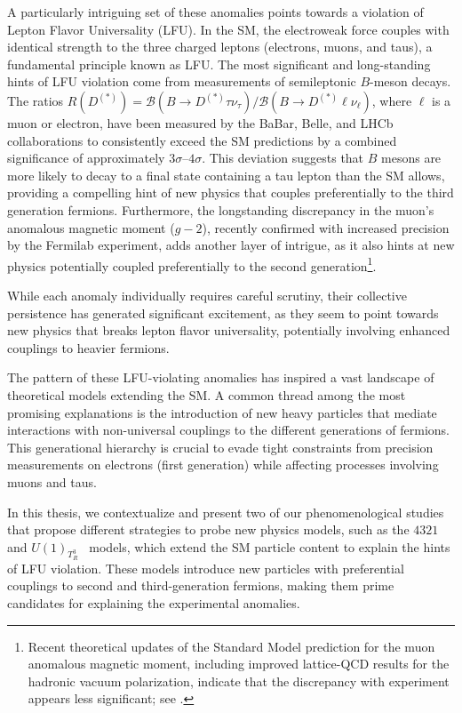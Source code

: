A particularly intriguing set of these anomalies points towards a violation of Lepton Flavor Universality (LFU). In the SM, the electroweak force couples with identical strength to the three charged leptons (electrons, muons, and taus), a fundamental principle known as LFU. The most significant and long-standing hints of LFU violation come from measurements of semileptonic $B$-meson decays. The ratios $R(D^{(*)}) = \mathcal{B}(B \to D^{(*)} \tau \nu_\tau) / \mathcal{B}(B \to D^{(*)} \ell \nu_\ell)$, where $\ell$ is a muon or electron, have been measured by the BaBar, Belle, and LHCb collaborations to consistently exceed the SM predictions by a combined significance of approximately $3\sigma$--$4\sigma$. This deviation suggests that $B$ mesons are more likely to decay to a final state containing a tau lepton than the SM allows, providing a compelling hint of new physics that couples preferentially to the third generation fermions. Furthermore, the longstanding discrepancy in the muon's anomalous magnetic moment ($g-2$), recently confirmed with increased precision by the Fermilab experiment, adds another layer of intrigue, as it also hints at new physics potentially coupled preferentially to the second generation\footnote{Recent theoretical updates of the Standard Model prediction for the muon anomalous magnetic moment, including improved lattice-QCD results for the hadronic vacuum polarization, indicate that the discrepancy with experiment appears less significant; see \cite{arXiv:2505.21476}.}.


While each anomaly individually requires careful scrutiny, their collective persistence has generated significant excitement, as they seem to point towards new physics that breaks lepton flavor universality, potentially involving enhanced couplings to heavier fermions.


The pattern of these LFU-violating anomalies has inspired a vast landscape of theoretical models extending the SM. A common thread among the most promising explanations is the introduction of new heavy particles that mediate interactions with non-universal couplings to the different generations of fermions. This generational hierarchy is crucial to evade tight constraints from precision measurements on electrons (first generation) while affecting processes involving muons and taus.

In this thesis, we contextualize and present two of our phenomenological studies that propose different strategies to probe new physics models, such as the $4321$~\cite{Florez2023} and $U(1)_{T^3_R}$~\cite{Qureshi:2024naw} models, which extend the SM particle content to explain the hints of LFU violation. These models introduce new particles with preferential couplings to second and third-generation fermions, making them prime candidates for explaining the experimental anomalies.

